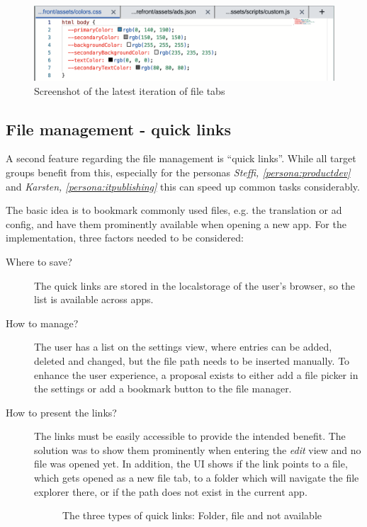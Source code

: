 \begin{figure}[h!]
  \includegraphics[width=\textwidth]{pics/file_tabs.png}
  \caption{Screenshot of the latest iteration of file tabs}
  \label{fig:file-tabs}
\end{figure}

\subsection{File management - quick links}

A second feature regarding the file management is ``quick links''. While all target groups benefit from this, especially for the personas \textit{Steffi, \ref{persona:productdev}} and \textit{Karsten, \ref{persona:itpublishing}}
this can speed up common tasks considerably.

The basic idea is to bookmark commonly used files, e.g. the translation or ad config, and have them prominently available when opening a new app.
For the implementation, three factors needed to be considered:
\begin{description}
  \item[Where to save?] The quick links are stored in the \Gls{localstorage} of the user's browser, so the list is available across apps.
  \item[How to manage?] The user has a list on the settings view, where entries can be added, deleted and changed, but the file path needs to be inserted manually. To enhance the user experience, a proposal exists to either add a file picker in the settings or add a bookmark button to the file manager.
  \item[How to present the links?] The links must be easily accessible to provide the intended benefit. The solution was to show them prominently when entering the \textit{edit} view and no file was opened yet.
  In addition, the UI shows if the link points to a file, which gets opened as a new file tab, to a folder which will navigate the file explorer there, or if the path does not exist in the current app.
  \begin{figure}[h!]
    \centering
    \caption{The three types of quick links: Folder, file and not available}
  \end{figure}
\end{description}

